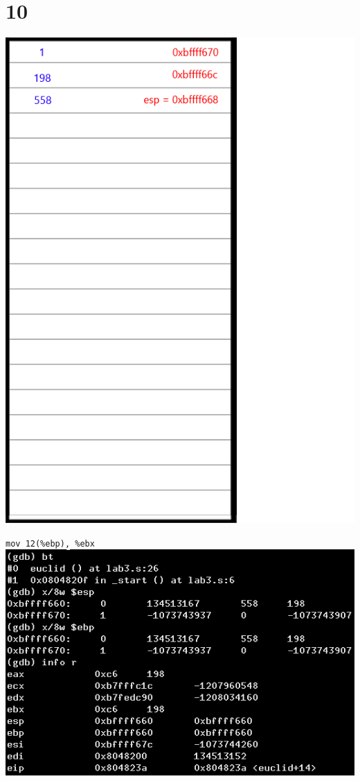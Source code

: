 \documentclass{article}
\begin{document}
\section*{10}
\begin{minipage}{5cm}
\includegraphics[scale=0.3]{s3.png}
\end{minipage}
\begin{minipage}{8cm}
\verb|mov 12(%ebp), %ebx|\\
\includegraphics[scale=0.4]{bxi10.png} \\
\end{minipage}
\clearpage
\end{document}
